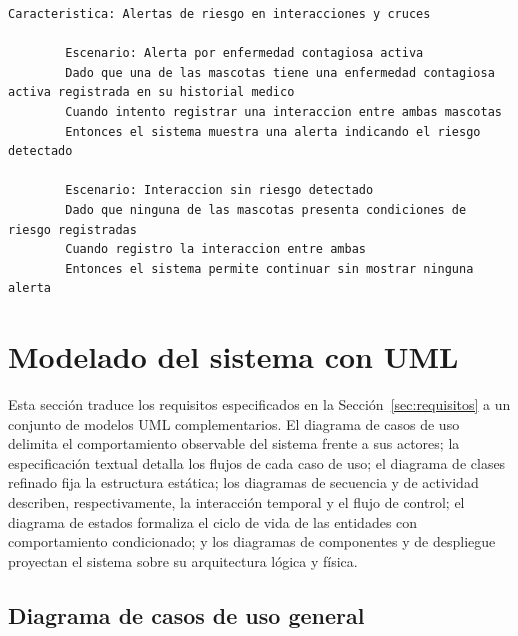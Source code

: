 \documentclass[journal,onecolumn]{IEEEtran}
\begin{document}
	\begin{lstlisting}[style=gherkin,caption={CA-15 --- Escenario de aceptación de la historia HU-15.},label={lst:ca15}]
		Caracteristica: Alertas de riesgo en interacciones y cruces
		
		Escenario: Alerta por enfermedad contagiosa activa
		Dado que una de las mascotas tiene una enfermedad contagiosa activa registrada en su historial medico
		Cuando intento registrar una interaccion entre ambas mascotas
		Entonces el sistema muestra una alerta indicando el riesgo detectado
		
		Escenario: Interaccion sin riesgo detectado
		Dado que ninguna de las mascotas presenta condiciones de riesgo registradas
		Cuando registro la interaccion entre ambas
		Entonces el sistema permite continuar sin mostrar ninguna alerta
	\end{lstlisting}
	
	\section{Modelado del sistema con UML}
	\label{sec:uml}
	
	Esta sección traduce los requisitos especificados en la
	Sección~\ref{sec:requisitos} a un conjunto de modelos UML complementarios.
	El diagrama de casos de uso delimita el comportamiento observable del
	sistema frente a sus actores; la especificación textual detalla los flujos
	de cada caso de uso; el diagrama de clases refinado fija la estructura
	estática; los diagramas de secuencia y de actividad describen,
	respectivamente, la interacción temporal y el flujo de control; el diagrama
	de estados formaliza el ciclo de vida de las entidades con comportamiento
	condicionado; y los diagramas de componentes y de despliegue proyectan el
	sistema sobre su arquitectura lógica y física.
	
	\subsection{Diagrama de casos de uso general}
	\label{sec:cu-general}
	
\end{document}
